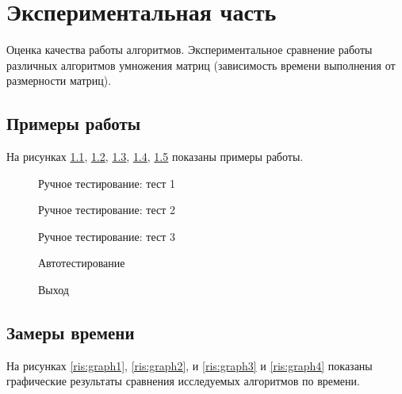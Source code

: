 


\chapter{Экспериментальная часть}\label{exp}

Оценка качества работы алгоритмов. Экспериментальное сравнение работы различных алгоритмов умножения матриц 
(зависимость времени выполнения от размерности матриц).

\section{Примеры работы}\label{examples}

На рисунках \ref{ris:w1}, \ref{ris:w2}, \ref{ris:w3}, \ref{ris:w4}, \ref{ris:w5} показаны примеры работы.

\begin{figure}[H]
    \center{\texttt{[image: w1]}}
    \caption{Ручное тестирование: тест 1}
    \label{ris:w1}
\end{figure}

\begin{figure}[H]
    \center{\texttt{[image: w2]}}
    \caption{Ручное тестирование: тест 2}
    \label{ris:w2}
\end{figure}

\begin{figure}[H]
    \center{\texttt{[image: w3]}}
    \caption{Ручное тестирование: тест 3}
    \label{ris:w3}
\end{figure}

\begin{figure}[H]
    \center{\texttt{[image: w4]}}
    \caption{Автотестирование}
    \label{ris:w4}
\end{figure}

\begin{figure}[H]
    \center{\texttt{[image: w5]}}
    \caption{Выход}
    \label{ris:w5}
\end{figure}
  
\section{Замеры времени}\label{experimentgraph}

На рисунках \ref{ris:graph1}, \ref{ris:graph2}, и \ref{ris:graph3}  и \ref{ris:graph4} показаны графические результаты сравнения исследуемых алгоритмов по времени. 

